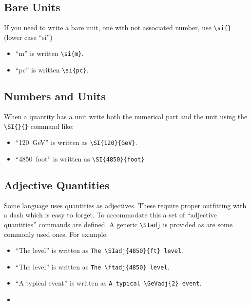 \subsection{Bare Units}

If you need to write a bare unit, one with not associated number, use
\verb|\si{}| (lower case ``si'')

\begin{itemize}
\item ``\si{m}'' is written \verb|\si{m}|.
\item ``\si{pc}'' is written \verb|\si{pc}|.
\end{itemize}

\subsection{Numbers and Units}

When a quantity has a unit write both the numerical part and the unit
using the \verb|\SI{}{}| command like:

\begin{itemize}
\item ``\SI{120}{GeV}'' is written as \verb|\SI{120}{GeV}|.
\item ``\SI{4850}{foot}'' is written as \verb|\SI{4850}{foot}|
\end{itemize}

\subsection{Adjective Quantities}

Some language uses quantities as adjectives.
These require proper outfitting with a dash which is easy to forget.
To accommodate this a set of ``adjective quantities'' commands are defined.
A generic \verb|\SIadj| is provided as are some commonly used ones.
For example:

\begin{itemize}
\item ``The  level'' is written as \verb|The \SIadj{4850}{ft} level|.
\item ``The  level'' is written as \verb|The \ftadj{4850} level|.
\item ``A typical  event'' is written as \verb|A typical \GeVadj{2} event|.
\item 
\end{itemize}

